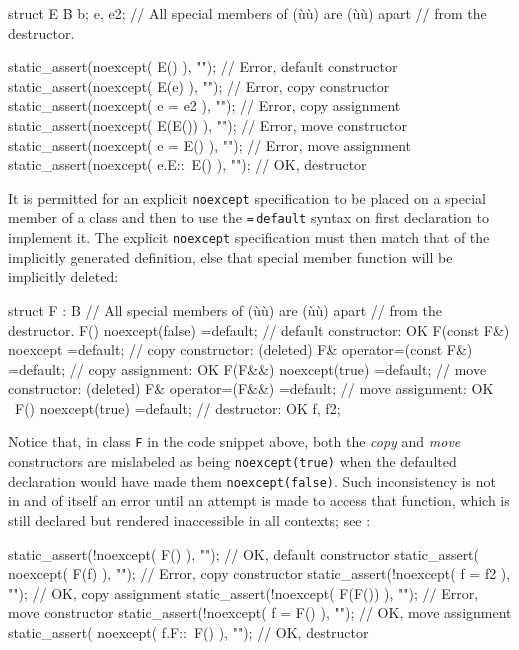 \begin{emcppslisting}
struct E { B b; } e, e2;  // All special members of (ù{}ù) are (ù{}ù) apart
                          // from the destructor.

static_assert(noexcept( E()       ), "");  // Error, default constructor
static_assert(noexcept( E(e)      ), "");  // Error, copy constructor
static_assert(noexcept( e = e2    ), "");  // Error, copy assignment
static_assert(noexcept( E(E())    ), "");  // Error, move constructor
static_assert(noexcept( e = E()   ), "");  // Error, move assignment
static_assert(noexcept( e.E::~E() ), "");  // OK, destructor
\end{emcppslisting}
    

\noindent It is permitted for an explicit \lstinline!noexcept! specification to be
placed on a special member of a class and then to use the
\lstinline!=!\,\lstinline!default! syntax on first declaration to implement it. The
explicit \lstinline!noexcept! specification must then match that of the
implicitly generated definition, else that special member function will
be implicitly deleted:

\begin{emcppslisting}
struct F : B  // All special members of (ù{}ù) are (ù{}ù) apart
              // from the destructor.
{
    F() noexcept(false)    =default;  // default constructor: OK
    F(const F&) noexcept   =default;  // copy constructor:    (deleted)
    F& operator=(const F&) =default;  // copy assignment:     OK
    F(F&&) noexcept(true)  =default;  // move constructor:    (deleted)
    F& operator=(F&&)      =default;  // move assignment:     OK
    ~F() noexcept(true)    =default;  // destructor:          OK
} f, f2;
\end{emcppslisting}
    

\noindent Notice that, in class \lstinline!F! in the code snippet above, both the
\emph{copy} and \emph{move} constructors are mislabeled as being
\lstinline!noexcept(true)! when the defaulted declaration would have made
them \lstinline!noexcept(false)!. Such inconsistency is not in and of
itself an error until an attempt is made to access that function, which
is still declared but rendered inaccessible in all contexts; see
:

\begin{emcppslisting}
static_assert(!noexcept( F()       ), "");   // OK,    default constructor
static_assert( noexcept( F(f)      ),  "");  // Error, copy constructor
static_assert(!noexcept( f = f2    ), "");   // OK,    copy assignment
static_assert(!noexcept( F(F())    ), "");   // Error, move constructor
static_assert(!noexcept( f = F()   ), "");   // OK,    move assignment
static_assert( noexcept( f.F::~F() ),  "");  // OK,    destructor
\end{emcppslisting}
    

